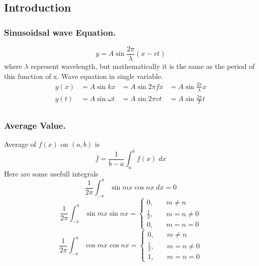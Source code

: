 \documentclass[../../../main.tex]{subfiles}
\begin{document}
\subsection{Introduction}
\subsubsection{Sinusoidsal wave Equation.}
\begin{equation*}
    y=A\sin\frac{2\pi }{\lambda}(x-vt)
\end{equation*}
where $\lambda$ represent wavelength, but mathematically it is the same as the period of this function of x.
Wave equation in single variable.
\begin{align*}
    y(x) & =A\sin k x      & =A \sin 2\pi f x & = A \sin \frac{2\pi}{\lambda}x \\
    y(t) & =A\sin \omega t & = A\sin 2\pi v t & =A \sin \frac{2\pi}{T}t        \\
\end{align*}

\subsubsection{Average Value.} Average of $f(x)$ on $(a, b)$ is
\begin{equation*}
    \bar{f}=\frac{1}{b-a}\int_{a}^{b}f(x)\;dx
\end{equation*}
Here are some usefull integrals
\begin{equation*}
    \frac{1}{2\pi}\int_{-\pi}^{\pi} \sin mx\cos nx\;dx=0
\end{equation*}
\begin{equation*}
    \frac{1}{2\pi}\int_{-\pi}^{\pi} \sin mx\sin nx=\begin{cases}
        0,\quad           & m\neq n   \\
        \frac{1}{2},\quad & m=n\neq 0 \\
        0,\quad           & m=n=0
    \end{cases}
\end{equation*}
\begin{equation*}
    \frac{1}{2\pi}\int_{-\pi}^{\pi} \cos mx\cos nx=\begin{cases}
        0,\quad           & m\neq n   \\
        \frac{1}{2},\quad & m=n\neq 0 \\
        1,\quad           & m=n=0
    \end{cases}
\end{equation*}
\end{document}
